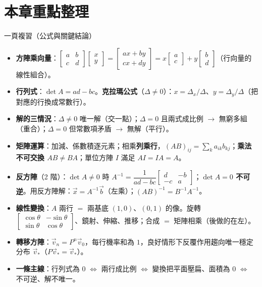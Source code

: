 \documentclass[11pt]{article}
\begin{document}
\section*{\sffamily 本章重點整理}

\begin{補充框}{一頁複習（公式與關鍵結論）}
\begin{itemize}\setlength{\itemsep}{2pt}
\item \textbf{方陣乘向量}：$\begin{bmatrix} a & b\\ c & d \end{bmatrix}\begin{bmatrix} x\\ y \end{bmatrix}=\begin{bmatrix} ax+by\\ cx+dy \end{bmatrix}=x\begin{bmatrix} a\\ c \end{bmatrix}+y\begin{bmatrix} b\\ d \end{bmatrix}$（行向量的線性組合）。
\item \textbf{行列式}：$\det A=ad-bc$。\textbf{克拉瑪公式}（$\Delta\ne0$）：$x=\Delta_x/\Delta$、$y=\Delta_y/\Delta$（把對應的行換成常數行）。
\item \textbf{解的三情況}：$\Delta\ne0$ 唯一解（交一點）；$\Delta=0$ 且兩式成比例 $\rightarrow$ 無窮多組（重合）；$\Delta=0$ 但常數項矛盾 $\rightarrow$ 無解（平行）。
\item \textbf{矩陣運算}：加減、係數積逐元素；相乘\textbf{列乘行}，$(AB)_{ij}=\sum_k a_{ik}b_{kj}$；\textbf{乘法不可交換 $AB\ne BA$}；單位方陣 $I$ 滿足 $AI=IA=A$。
\item \textbf{反方陣}（2 階）：$\det A\ne0$ 時 $A^{-1}=\dfrac{1}{ad-bc}\begin{bmatrix} d & -b\\ -c & a \end{bmatrix}$；\textbf{$\det A=0$ 不可逆}。用反方陣解：$\vec x=A^{-1}\vec b$（左乘）；$(AB)^{-1}=B^{-1}A^{-1}$。
\item \textbf{線性變換}：$A$ 兩行 $=$ 兩基底 $(1,0)$、$(0,1)$ 的像。旋轉 $\begin{bmatrix} \cos\theta & -\sin\theta\\ \sin\theta & \cos\theta \end{bmatrix}$、鏡射、伸縮、推移；合成 $=$ 矩陣相乘（後做的在左）。
\item \textbf{轉移方陣}：$\vec v_n=P^n\vec v_0$，每行機率和為 $1$，良好情形下反覆作用趨向唯一穩定分布 $\vec v_*$（$P\vec v_*=\vec v_*$）。
\item \textbf{一條主線}：行列式為 $0$ $\Longleftrightarrow$ 兩行成比例 $\Longleftrightarrow$ 變換把平面壓扁、面積為 $0$ $\Longleftrightarrow$ 不可逆、解不唯一。
\end{itemize}
\end{補充框}
\end{document}
